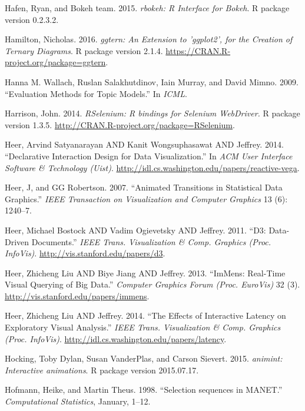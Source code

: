 \documentclass[12pt,]{isuthesis}
\begin{document}
\hypertarget{ref-rbokeh}{}
Hafen, Ryan, and Bokeh team. 2015. \emph{rbokeh: R Interface for Bokeh}.
R package version 0.2.3.2.

\hypertarget{ref-ggtern}{}
Hamilton, Nicholas. 2016. \emph{ggtern: An Extension to 'ggplot2', for
the Creation of Ternary Diagrams}. R package version 2.1.4.
\url{https://CRAN.R-project.org/package=ggtern}.

\hypertarget{ref-Wallach}{}
Hanna M. Wallach, Ruslan Salakhutdinov, Iain Murray, and David Mimno.
2009. ``Evaluation Methods for Topic Models.'' In \emph{ICML}.

\hypertarget{ref-RSelenium}{}
Harrison, John. 2014. \emph{RSelenium: R bindings for Selenium
WebDriver.} R package version 1.3.5.
\url{http://CRAN.R-project.org/package=RSelenium}.

\hypertarget{ref-vega}{}
Heer, Arvind Satyanarayan AND Kanit Wongsuphasawat AND Jeffrey. 2014.
``Declarative Interaction Design for Data Visualization.'' In \emph{ACM
User Interface Software \& Technology (Uist)}.
\url{http://idl.cs.washington.edu/papers/reactive-vega}.

\hypertarget{ref-animated-transitions}{}
Heer, J, and GG Robertson. 2007. ``Animated Transitions in Statistical
Data Graphics.'' \emph{IEEE Transaction on Visualization and Computer
Graphics} 13 (6): 1240--7.

\hypertarget{ref-Bostock:2011}{}
Heer, Michael Bostock AND Vadim Ogievetsky AND Jeffrey. 2011. ``D3:
Data-Driven Documents.'' \emph{IEEE Trans. Visualization \& Comp.
Graphics (Proc. InfoVis)}. \url{http://vis.stanford.edu/papers/d3}.

\hypertarget{ref-2013-immens}{}
Heer, Zhicheng Liu AND Biye Jiang AND Jeffrey. 2013. ``ImMens: Real-Time
Visual Querying of Big Data.'' \emph{Computer Graphics Forum (Proc.
EuroVis)} 32 (3). \url{http://vis.stanford.edu/papers/immens}.

\hypertarget{ref-2014-latency}{}
Heer, Zhicheng Liu AND Jeffrey. 2014. ``The Effects of Interactive
Latency on Exploratory Visual Analysis.'' \emph{IEEE Trans.
Visualization \& Comp. Graphics (Proc. InfoVis)}.
\url{http://idl.cs.washington.edu/papers/latency}.

\hypertarget{ref-animint}{}
Hocking, Toby Dylan, Susan VanderPlas, and Carson Sievert. 2015.
\emph{animint: Interactive animations}. R package version 2015.07.17.

\hypertarget{ref-selection-sequences}{}
Hofmann, Heike, and Martin Theus. 1998. ``Selection sequences in
MANET.'' \emph{Computational Statistics}, January, 1--12.
\end{document}
